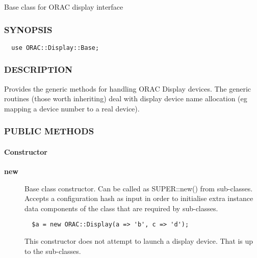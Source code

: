 Base class for ORAC display interface

\subsubsection*{SYNOPSIS\label{ORAC::Display::Base_SYNOPSIS}}\begin{verbatim}
  use ORAC::Display::Base;
\end{verbatim}
\subsubsection*{DESCRIPTION\label{ORAC::Display::Base_DESCRIPTION}}

Provides the generic methods for handling ORAC Display devices.
The generic routines (those worth inheriting) deal with display
device name allocation (eg mapping a device number to a real device).

\subsubsection*{PUBLIC METHODS\label{ORAC::Display::Base_PUBLIC_METHODS}}\paragraph*{Constructor\label{ORAC::Display::Base_Constructor}}\begin{description}
\item[\textbf{new}] \mbox{}

Base class constructor. Can be called as SUPER::new() from
sub-classes. Accepts a configuration hash as input in order to
initialise extra instance data components of the class that are
required by sub-classes.

\begin{verbatim}
  $a = new ORAC::Display(a => 'b', c => 'd');
\end{verbatim}


This constructor does not attempt to launch a display device.
That is up to the sub-classes.

\end{description}
